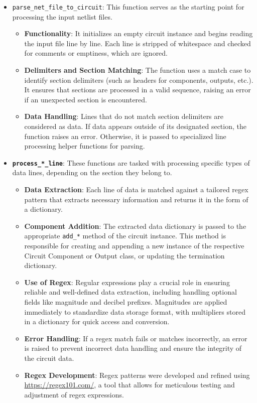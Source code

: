 \documentclass[conference]{IEEEtran}
\begin{document}
\begin{itemize}
  \item {\texttt{parse\_net\_file\_to\_circuit}}: This function serves as the starting point for processing the input netlist files.
        \begin{itemize}
          \item \textbf{Functionality}: It initializes an empty circuit instance and begins reading the input file line by line.
                Each line is stripped of whitespace and checked for comments or emptiness, which are ignored.
          \item \textbf{Delimiters and Section Matching}: The function uses a match case to identify section delimiters
                (such as headers for components, outputs, etc.). It ensures that sections are processed in a valid sequence,
                raising an error if an unexpected section is encountered.
          \item \textbf{Data Handling}: Lines that do not match section delimiters are considered as data. If data appears
                outside of its designated section, the function raises an error. Otherwise, it is passed to specialized line processing
                helper functions for parsing.
        \end{itemize}

  \item \textbf{\texttt{process\_*\_line}}: These functions are tasked with processing specific types of data lines, depending on
        the section they belong to.
        \begin{itemize}
          \item \textbf{Data Extraction}: Each line of data is matched against a tailored regex pattern that extracts necessary
                information and returns it in the form of a dictionary.
          \item \textbf{Component Addition}: The extracted data dictionary is passed to the appropriate \texttt{add\_*} method
                of the circuit instance. This method is responsible for creating and appending a new instance of the respective Circuit
                Component or Output class, or updating the termination dictionary.
          \item \textbf{Use of Regex}: Regular expressions play a crucial role in ensuring reliable and well-defined data extraction,
                including handling optional fields like magnitude and decibel prefixes. Magnitudes are applied immediately to standardize
                data storage format, with multipliers stored in a dictionary for quick access and conversion.
          \item \textbf{Error Handling}: If a regex match fails or matches incorrectly, an error is raised to prevent incorrect data
                handling and ensure the integrity of the circuit data.
          \item \textbf{Regex Development}: Regex patterns were developed and refined using \url{https://regex101.com/}, a tool that
                allows for meticulous testing and adjustment of regex expressions.
        \end{itemize}
\end{itemize}
\end{document}
